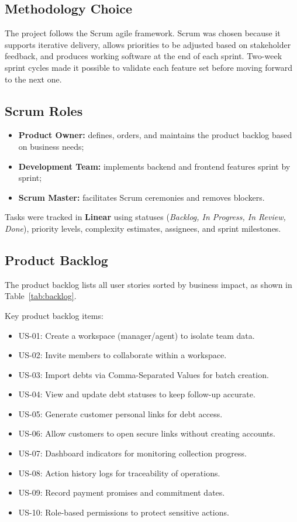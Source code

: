﻿\documentclass[12pt,a4paper]{report}
\begin{document}
\subsection{Methodology Choice}

The project follows the Scrum agile framework.
Scrum was chosen because it supports iterative delivery, allows priorities to be
adjusted based on stakeholder feedback, and produces working software at the end of
each sprint.
Two-week sprint cycles made it possible to validate each feature set before moving
forward to the next one.

\subsection{Scrum Roles}

\begin{itemize}
  \item \textbf{Product Owner:} defines, orders, and maintains the product backlog based on business needs;
  \item \textbf{Development Team:} implements backend and frontend features sprint by sprint;
  \item \textbf{Scrum Master:} facilitates Scrum ceremonies and removes blockers.
\end{itemize}

Tasks were tracked in \textbf{Linear} using statuses (\textit{Backlog, In Progress,
In Review, Done}), priority levels, complexity estimates, assignees, and sprint milestones.

\subsection{Product Backlog}

The product backlog lists all user stories sorted by business impact,
as shown in Table~\ref{tab:backlog}.

\noindent Key product backlog items:

\begin{itemize}
  \item US-01: Create a workspace (manager/agent) to isolate team data.
  \item US-02: Invite members to collaborate within a workspace.
  \item US-03: Import debts via Comma-Separated Values for batch creation.
  \item US-04: View and update debt statuses to keep follow-up accurate.
  \item US-05: Generate customer personal links for debt access.
  \item US-06: Allow customers to open secure links without creating accounts.
  \item US-07: Dashboard indicators for monitoring collection progress.
  \item US-08: Action history logs for traceability of operations.
  \item US-09: Record payment promises and commitment dates.
  \item US-10: Role-based permissions to protect sensitive actions.
\end{itemize}
\end{document}
